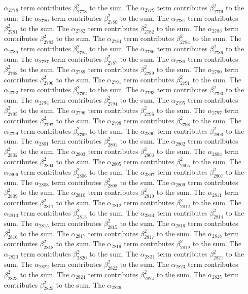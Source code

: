 \begin{lemma}
$\alpha_{2778}$ term contributes $\beta_{2778}^{2}$ to the sum. The $\alpha_{2779}$ term contributes $\beta_{2779}^{2}$ to the sum. The $\alpha_{2780}$ term contributes $\beta_{2780}^{2}$ to the sum. The $\alpha_{2781}$ term contributes $\beta_{2781}^{2}$ to the sum. The $\alpha_{2782}$ term contributes $\beta_{2782}^{2}$ to the sum. The $\alpha_{2783}$ term contributes $\beta_{2783}^{2}$ to the sum. The $\alpha_{2784}$ term contributes $\beta_{2784}^{2}$ to the sum. The $\alpha_{2785}$ term contributes $\beta_{2785}^{2}$ to the sum. The $\alpha_{2786}$ term contributes $\beta_{2786}^{2}$ to the sum. The $\alpha_{2787}$ term contributes $\beta_{2787}^{2}$ to the sum. The $\alpha_{2788}$ term contributes $\beta_{2788}^{2}$ to the sum. The $\alpha_{2789}$ term contributes $\beta_{2789}^{2}$ to the sum. The $\alpha_{2790}$ term contributes $\beta_{2790}^{2}$ to the sum. The $\alpha_{2791}$ term contributes $\beta_{2791}^{2}$ to the sum. The $\alpha_{2792}$ term contributes $\beta_{2792}^{2}$ to the sum. The $\alpha_{2793}$ term contributes $\beta_{2793}^{2}$ to the sum. The $\alpha_{2794}$ term contributes $\beta_{2794}^{2}$ to the sum. The $\alpha_{2795}$ term contributes $\beta_{2795}^{2}$ to the sum. The $\alpha_{2796}$ term contributes $\beta_{2796}^{2}$ to the sum. The $\alpha_{2797}$ term contributes $\beta_{2797}^{2}$ to the sum. The $\alpha_{2798}$ term contributes $\beta_{2798}^{2}$ to the sum. The $\alpha_{2799}$ term contributes $\beta_{2799}^{2}$ to the sum. The $\alpha_{2800}$ term contributes $\beta_{2800}^{2}$ to the sum. The $\alpha_{2801}$ term contributes $\beta_{2801}^{2}$ to the sum. The $\alpha_{2802}$ term contributes $\beta_{2802}^{2}$ to the sum. The $\alpha_{2803}$ term contributes $\beta_{2803}^{2}$ to the sum. The $\alpha_{2804}$ term contributes $\beta_{2804}^{2}$ to the sum. The $\alpha_{2805}$ term contributes $\beta_{2805}^{2}$ to the sum. The $\alpha_{2806}$ term contributes $\beta_{2806}^{2}$ to the sum. The $\alpha_{2807}$ term contributes $\beta_{2807}^{2}$ to the sum. The $\alpha_{2808}$ term contributes $\beta_{2808}^{2}$ to the sum. The $\alpha_{2809}$ term contributes $\beta_{2809}^{2}$ to the sum. The $\alpha_{2810}$ term contributes $\beta_{2810}^{2}$ to the sum. The $\alpha_{2811}$ term contributes $\beta_{2811}^{2}$ to the sum. The $\alpha_{2812}$ term contributes $\beta_{2812}^{2}$ to the sum. The $\alpha_{2813}$ term contributes $\beta_{2813}^{2}$ to the sum. The $\alpha_{2814}$ term contributes $\beta_{2814}^{2}$ to the sum. The $\alpha_{2815}$ term contributes $\beta_{2815}^{2}$ to the sum. The $\alpha_{2816}$ term contributes $\beta_{2816}^{2}$ to the sum. The $\alpha_{2817}$ term contributes $\beta_{2817}^{2}$ to the sum. The $\alpha_{2818}$ term contributes $\beta_{2818}^{2}$ to the sum. The $\alpha_{2819}$ term contributes $\beta_{2819}^{2}$ to the sum. The $\alpha_{2820}$ term contributes $\beta_{2820}^{2}$ to the sum. The $\alpha_{2821}$ term contributes $\beta_{2821}^{2}$ to the sum. The $\alpha_{2822}$ term contributes $\beta_{2822}^{2}$ to the sum. The $\alpha_{2823}$ term contributes $\beta_{2823}^{2}$ to the sum. The $\alpha_{2824}$ term contributes $\beta_{2824}^{2}$ to the sum. The $\alpha_{2825}$ term contributes $\beta_{2825}^{2}$ to the sum. The $\alpha_{2826}$ 
\end{lemma}
